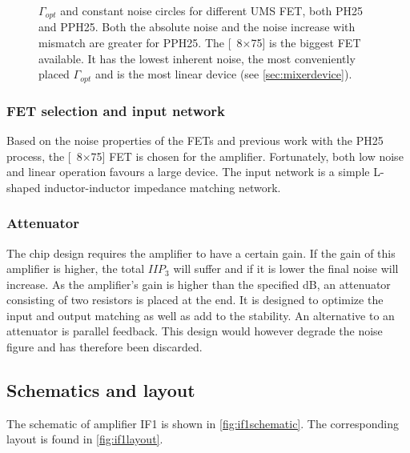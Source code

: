 			\begin{figure}[hbt!]
				\centering
				\caption[$\Gamma_{opt}$ and constant noise circles for UMS FETs.]{$\Gamma_{opt}$ and constant noise circles for different UMS FET, both PH25 and PPH25. Both the absolute noise and the noise increase with mismatch are greater for PPH25. The \unit[8$\times$75]{\mum} is the biggest FET available. It has the lowest inherent noise, the most conveniently placed $\Gamma_{opt}$ and is the most linear device (see \autoref{sec:mixerdevice}).}\label{fig:if1noisematch}
			\end{figure}

			\subsubsection{FET selection and input network}
				Based on the noise properties of the FETs and previous work with the PH25 process\autocite{gustavsson07}, the \unit[8$\times$75]{\mum} FET is chosen for the amplifier. Fortunately, both low noise and linear operation favours a large device. The input network is a simple L-shaped inductor-inductor impedance matching network.

			\subsubsection{Attenuator}
				The chip design requires the amplifier to have a certain gain. If the gain of this amplifier is higher, the total $IIP_3$ will suffer and if it is lower the final noise will increase. As the amplifier's gain is higher than the specified \unit[12]{dB}, an attenuator consisting of two resistors is placed at the end. It is designed to optimize the input and output matching as well as add to the stability.\autocite{delpy06} An alternative to an attenuator is parallel feedback. This design would however degrade the noise figure and has therefore been discarded.

		\subsection{Schematics and layout}
			The schematic of amplifier IF1 is shown in \autoref{fig:if1schematic}. The corresponding layout is found in \autoref{fig:if1layout}.

